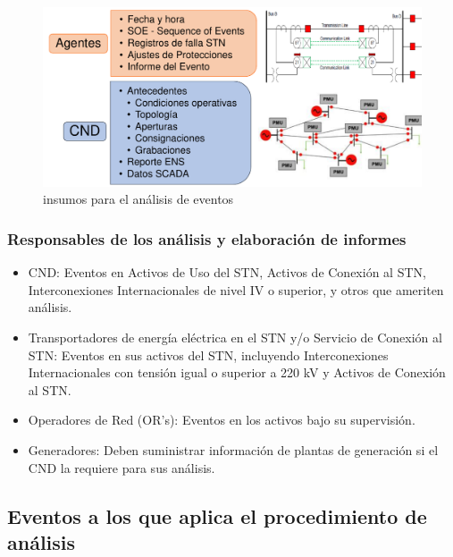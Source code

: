\documentclass[a5paper]{book}%
\begin{document}
\begin{figure}[H]
  \centering
  
  \caption{insumos para el análisis de eventos}
  \label{fig:insumoseventos}
  \includegraphics[width=0.8\linewidth]{insumos_eventos}
\end{figure}

\subsubsection{Responsables de los análisis y elaboración de informes}

\begin{itemize}
  
\item CND: Eventos en Activos de Uso del STN, Activos de Conexión al STN, Interconexiones Internacionales de nivel IV o superior, y otros que ameriten análisis.
    
  \item Transportadores de energía eléctrica en el \ac{STN} y/o Servicio de Conexión al \ac{STN}: Eventos en sus activos del \ac{STN}, incluyendo Interconexiones Internacionales con tensión igual o superior a 220 kV y Activos de Conexión al \ac{STN}.
  
  \item Operadores de Red (OR's): Eventos en los activos bajo su supervisión.
    
  \item Generadores: Deben suministrar información de plantas de generación si el \ac{CND} la requiere para sus análisis.

\end{itemize}



\subsection{Eventos a los que aplica el procedimiento de análisis}
\end{document}
